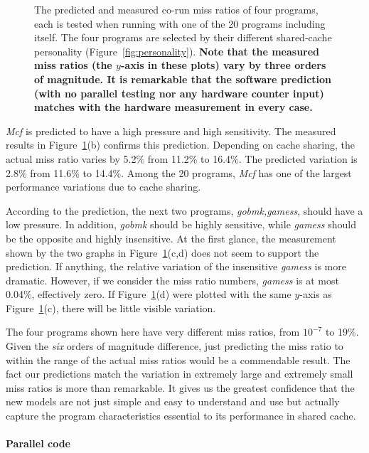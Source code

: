 \begin{figure}[h!]
{  }
  \caption{The predicted and measured co-run miss ratios of four
    programs, each is tested when running with one of the 20 programs
    including itself. The four programs are selected by their
    different shared-cache personality (Figure~\ref{fig:personality}).
    {\bf Note that the measured miss ratios (the $y$-axis in
      these plots) vary by three orders of magnitude.  It is
      remarkable that the software prediction (with no parallel
      testing nor any hardware counter input) matches with the
      hardware measurement in every case.}}
\label{fig:corun-bar}
\end{figure}

\emph{Mcf} is predicted to have a high pressure and high sensitivity.
The measured results in Figure~\ref{fig:corun-bar}(b) confirms this
prediction.  Depending on cache sharing, the actual miss ratio varies
by 5.2\% from 11.2\% to 16.4\%.  The predicted variation is 2.8\% from
11.6\% to 14.4\%.  Among the 20 programs, \emph{Mcf} has one of the
largest performance variations due to cache sharing.

According to the prediction, the next two programs,
\emph{gobmk,gamess}, should have a low pressure.  In addition,
\emph{gobmk} should be highly sensitive, while \emph{gamess} should be
the opposite and highly insensitive.  At the first glance, the
measurement shown by the two graphs in Figure~\ref{fig:corun-bar}(c,d)
does not seem to support the prediction.  If anything, the relative
variation of the insensitive \emph{gamess} is more dramatic.  However,
if we consider the miss ratio numbers, \emph{gamess} is at most
0.04\%, effectively zero.  If Figure~\ref{fig:corun-bar}(d) were plotted
with the same $y$-axis as Figure~\ref{fig:corun-bar}(c), there will be
little visible variation.

The four programs shown here have very different miss ratios, from
$10^{-7}$ to 19\%.  Given the \emph{six} orders of magnitude
difference, just predicting the miss ratio to within the range of the
actual miss ratios would be a commendable result.  The fact our
predictions match the variation in extremely large and extremely small
miss ratios is more than remarkable.  It gives us the greatest
confidence that the new models are not just simple and easy to
understand and use but actually capture the program characteristics
essential to its performance in shared cache.

\paragraph{Parallel code}

